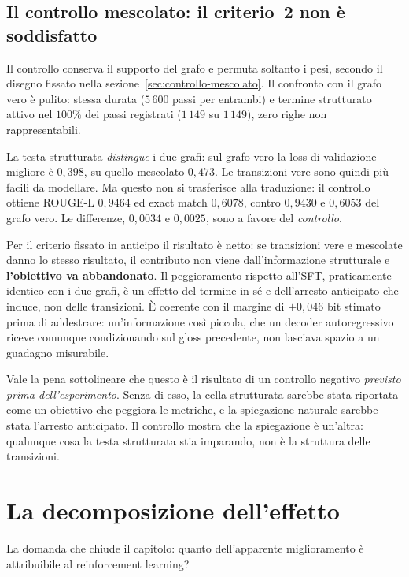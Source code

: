 \subsection{Il controllo mescolato: il criterio~2 non è soddisfatto}

Il controllo conserva il supporto del grafo e permuta soltanto i pesi, secondo
il disegno fissato nella sezione~\ref{sec:controllo-mescolato}. Il confronto con
il grafo vero è pulito: stessa durata ($5\,600$ passi per entrambi) e termine
strutturato attivo nel $100\%$ dei passi registrati ($1\,149$ su $1\,149$), zero
righe non rappresentabili.

La testa strutturata \emph{distingue} i due grafi: sul grafo vero la loss di
validazione migliore è $0{,}398$, su quello mescolato $0{,}473$. Le transizioni
vere sono quindi più facili da modellare. Ma questo non si trasferisce alla
traduzione: il controllo ottiene ROUGE-L $0{,}9464$ ed exact match $0{,}6078$,
contro $0{,}9430$ e $0{,}6053$ del grafo vero. Le differenze, $0{,}0034$ e
$0{,}0025$, sono a favore del \emph{controllo}.

Per il criterio fissato in anticipo il risultato è netto: se transizioni vere e
mescolate danno lo stesso risultato, il contributo non viene dall'informazione
strutturale e \textbf{l'obiettivo va abbandonato}. Il peggioramento rispetto
all'SFT, praticamente identico con i due grafi, è un effetto del termine in sé e
dell'arresto anticipato che induce, non delle transizioni. È coerente con il
margine di $+0{,}046$ bit stimato prima di addestrare: un'informazione così
piccola, che un decoder autoregressivo riceve comunque condizionando sul gloss
precedente, non lasciava spazio a un guadagno misurabile.

Vale la pena sottolineare che questo è il risultato di un controllo negativo
\emph{previsto prima dell'esperimento}. Senza di esso, la cella strutturata
sarebbe stata riportata come un obiettivo che peggiora le metriche, e la
spiegazione naturale sarebbe stata l'arresto anticipato. Il controllo mostra che
la spiegazione è un'altra: qualunque cosa la testa strutturata stia imparando,
non è la struttura delle transizioni.

\section{La decomposizione dell'effetto}
\label{sec:decomposizione}

La domanda che chiude il capitolo: quanto dell'apparente miglioramento è
attribuibile al reinforcement learning?

